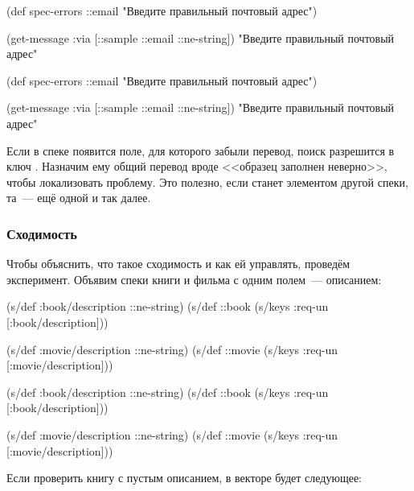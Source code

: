 \ifnarrow

\begin{clojure}
(def spec-errors
  {::email
   "Введите правильный почтовый адрес"})

(get-message
  {:via [::sample ::email ::ne-string]})
"Введите правильный почтовый адрес"
\end{clojure}

\else

\begin{clojure}
(def spec-errors
  {::email "Введите правильный почтовый адрес"})

(get-message {:via [::sample ::email ::ne-string]})
"Введите правильный почтовый адрес"
\end{clojure}

\fi

Если в спеке  появится поле, для которого забыли перевод, поиск
разрешится в ключ . Назначим ему общий перевод вроде <<образец
заполнен неверно>>, чтобы локализовать проблему. Это полезно, если
 станет элементом другой спеки, та~--- ещё одной и так далее.

\subsubsection*{Сходимость}

Чтобы объяснить, что такое сходимость и как ей управлять, проведём
эксперимент. Объявим спеки книги и фильма с одним полем~--- описанием:

\ifnarrow

\begin{clojure}
(s/def :book/description ::ne-string)
(s/def ::book
  (s/keys :req-un [:book/description]))

(s/def :movie/description ::ne-string)
(s/def ::movie
  (s/keys :req-un [:movie/description]))
\end{clojure}

\else

\begin{clojure}
(s/def :book/description ::ne-string)
(s/def ::book (s/keys :req-un [:book/description]))

(s/def :movie/description ::ne-string)
(s/def ::movie (s/keys :req-un [:movie/description]))
\end{clojure}

\fi

Если проверить книгу с пустым описанием, в векторе  будет следующее:


